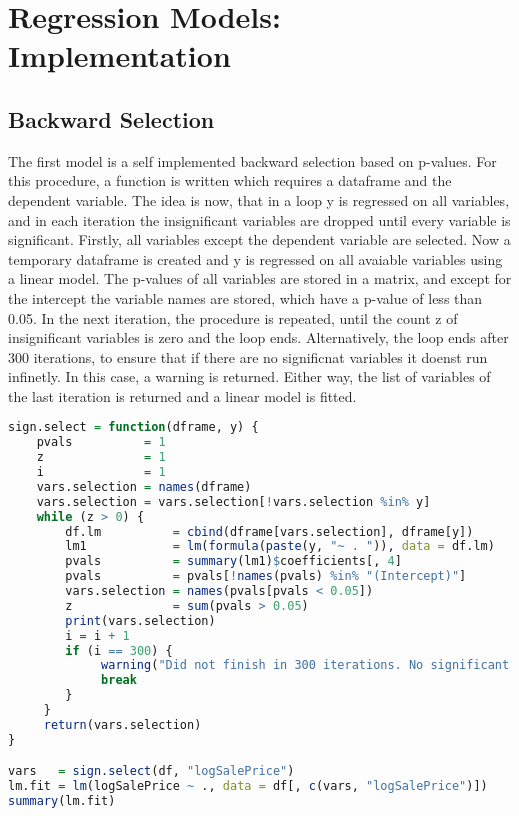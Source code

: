 \section{Regression Models: Implementation}
\subsection{Backward Selection}
The first model is a self implemented backward selection based on p-values.
For this procedure, a function is written which requires a dataframe
and the dependent variable. The idea is now, that in a loop y is regressed
on all variables, and in each iteration the insignificant variables
are dropped until every variable is significant. Firstly, all variables
except the dependent variable are selected. Now a temporary dataframe
is created and y is regressed on all avaiable variables using a linear
model. The p-values of all variables are stored in a matrix, and except
for the intercept the variable names are stored, which have a p-value
of less than 0.05. In the next iteration, the procedure is repeated,
until the count z of insignificant variables is zero and the loop
ends. Alternatively, the loop ends after 300 iterations, to ensure
that if there are no significnat variables it doenst run infinetly.
In this case, a warning is returned. 
Either way, the list of variables of the last iteration is returned and a linear model is fitted. 

\begin{lstlisting}[language=R]
sign.select = function(dframe, y) {
    pvals          = 1
    z              = 1
    i              = 1
    vars.selection = names(dframe)
    vars.selection = vars.selection[!vars.selection %in% y]
    while (z > 0) {
        df.lm          = cbind(dframe[vars.selection], dframe[y])
        lm1            = lm(formula(paste(y, "~ . ")), data = df.lm)
        pvals          = summary(lm1)$coefficients[, 4]
        pvals          = pvals[!names(pvals) %in% "(Intercept)"]
        vars.selection = names(pvals[pvals < 0.05])
        z              = sum(pvals > 0.05)
        print(vars.selection)
        i = i + 1
        if (i == 300) {
             warning("Did not finish in 300 iterations. No significant variables in data set?")
             break
        }
     }
     return(vars.selection)
}

vars   = sign.select(df, "logSalePrice")
lm.fit = lm(logSalePrice ~ ., data = df[, c(vars, "logSalePrice")])
summary(lm.fit)
\end{lstlisting}
